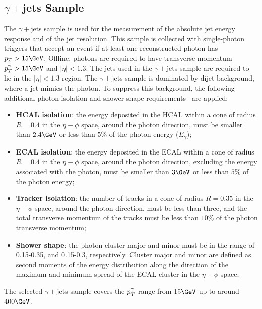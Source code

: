 
\subsection{$\gamma+$jets Sample}

The $\gamma+$jets sample is used for the measurement of the absolute jet energy response and of the jet \pt resolution. This sample is collected with single-photon triggers that accept an event if at least one reconstructed photon has $\pt>15\GeV$. Offline, photons are required to have transverse momentum $\pt^{\gamma}>15\GeV$ and $|\eta|<1.3$. The jets used in the $\gamma+$jets sample  are required to lie in the $|\eta|<1.3$ region. The $\gamma+$jets sample is dominated by dijet background, where a jet mimics the photon. To suppress this background, the following additional photon isolation and shower-shape requirements~\cite{EGM-10-005} are applied:

\begin{itemize}

\item
\textbf{HCAL isolation}: the energy deposited in the HCAL within a cone of radius $R=0.4$ in the $\eta-\phi$ space, around the photon direction, must be smaller than $2.4\GeV$ or less than $5\%$ of the photon energy ($E_{\gamma}$);

\item
\textbf{ECAL isolation}: the energy deposited in the ECAL within a cone of radius $R=0.4$ in the $\eta-\phi$ space, around the photon direction, excluding the energy associated with the photon, must be smaller than $3\GeV$ or less than $5\%$ of the photon energy;

\item
\textbf{Tracker isolation}: the number of tracks in a cone of radius $R=0.35$ in the $\eta-\phi$ space, around the photon direction, must be less than three, and the total transverse momentum of the tracks must be less than $10\%$ of the photon transverse momentum;

\item
\textbf{Shower shape}: the photon cluster major and minor must be in the range of 0.15-0.35, and 0.15-0.3, respectively. Cluster major and minor are defined as second moments of the energy distribution along the direction of the maximum and minimum spread of the ECAL cluster in the $\eta-\phi$ space;

\end{itemize}

The selected $\gamma+$jets sample covers the $p_{{T}}^{\gamma}$ range from $15\GeV$ up to around $400\GeV$.

